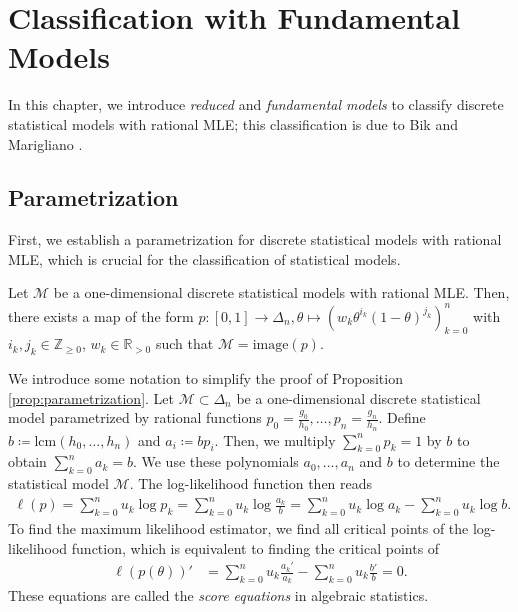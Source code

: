\chapter{Classification with Fundamental Models}

In this chapter, we introduce \emph{reduced} and \emph{fundamental models} to classify discrete statistical models with rational MLE; this classification is due to Bik and Marigliano \cite{bik2022classifying}. 

\section{Parametrization}

First, we establish a parametrization for discrete statistical models with rational MLE, which is crucial for the classification of statistical models.

\begin{proposition}\label{prop:parametrization}
    Let \( \mathcal{M} \) be a one-dimensional discrete statistical models with rational MLE. Then, there exists a map of the form \( p: [0,1] \to \Delta_n, \theta \mapsto (w_k \theta^{i_k} (1-\theta)^{j_k})_{k=0}^n \) with \( i_k, j_k \in \mathbb{Z}_{\geq 0} \), \( w_k \in \mathbb{R}_{> 0} \) such that \( \mathcal{M} = \mathrm{image}(p) \).
\end{proposition}

We introduce some notation to simplify the proof of Proposition \ref{prop:parametrization}.
Let \( \mathcal{M} \subset \Delta_n \) be a one-dimensional discrete statistical model parametrized by rational functions \( p_0 =  \frac{g_0}{h_0}, \dots, p_n =  \frac{g_n}{h_n} \). Define \( b \coloneqq \mathrm{lcm}(h_0, \dots, h_n) \) and \( a_i \coloneqq b p_i \). Then, we multiply \( \sum_{k=0}^n p_k = 1 \) by \( b \) to obtain \( \sum_{k=0}^n a_k = b \). We use these polynomials \( a_0, \dots, a_n \) and \( b \) to determine the statistical model \( \mathcal{M} \). The log-likelihood function then reads
\begin{align*}
    \ell(p) = \sum_{k=0}^n u_k \log p_k = \sum_{k=0}^n u_k \log \frac{a_k}{b} = \sum_{k=0}^n u_k \log a_k - \sum_{k=0}^n u_k \log b.
\end{align*}
To find the maximum likelihood estimator, we find all critical points of the log-likelihood function, which is equivalent to finding the critical points of
\begin{align}\label{eq:score-equations}
    \ell(p(\theta))' &= \sum_{k=0}^n u_k \frac{a_k'}{a_k} - \sum_{k=0}^n u_k \frac{b'}{b} = 0.
\end{align}
These equations are called the \emph{score equations} in algebraic statistics.

